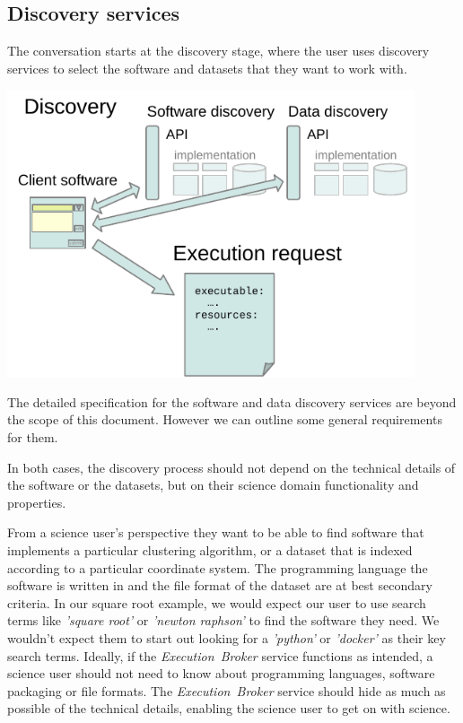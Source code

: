 \documentclass[11pt,a4paper]{ivoa}
\newcommand{\executionbroker} {\textit{Execution~Broker}}
\newcommand{\dataset}[1] {dataset#1}
\begin{document}
\subsection{Discovery services}
\label{sub-discovery-services}

The conversation starts at the discovery stage, where the user uses discovery services to
select the software and \dataset{s} that they want to work with.

\includegraphics[width=0.9\textwidth]{diagrams/data-discovery.pdf}

The detailed specification for the software and data discovery services are beyond the
scope of this document. However we can outline some general requirements for them.

In both cases, the discovery process should not depend on the technical details
of the software or the \dataset{s}, but on their science domain functionality and properties.

From a science user's perspective they want to be able to find software that implements
a particular clustering algorithm, or a \dataset{} that is indexed according to a particular
coordinate system.
The programming language the software is written in and the file format of the \dataset{}
are at best secondary criteria.
In our square root example, we would expect our user to use search terms like \textit{'square root'}
or \textit{'newton raphson'} to find the software they need.
We wouldn't expect them to start out looking for a \textit{'python'} or \textit{'docker'} as their key search terms.
Ideally, if the \executionbroker{} service functions as intended, a science user should not
need to know about programming languages, software packaging or file formats.
The \executionbroker{} service should hide as much as possible of the technical details,
enabling the science user to get on with science.
\end{document}
